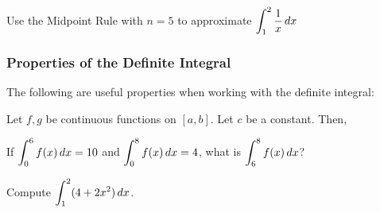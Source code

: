 \documentclass[notes]{subfiles}
\begin{document}
		\begin{ex}
			Use the Midpoint Rule with $n = 5$ to approximate $\displaystyle \int_1^2 \dfrac{1}{x}\, dx$
		\end{ex}
			\newpage
			
	\subsubsection*{Properties of the Definite Integral}	
		The following are useful properties when working with the definite integral:
			\begin{thm}
				 Let $f,g$ be continuous functions on $[a,b]$.  Let $c$ be a constant.  Then,
			\end{thm}
		
		\begin{ex}
			If $\displaystyle \int_0^6 f(x)\, dx = 10$ and $\displaystyle \int_0^8 f(x)\, dx = 4$, what is $\displaystyle\int_6^8 f(x)\, dx$?
		\end{ex}	
			\newpage
	
		\begin{ex}
			Compute $\displaystyle \int_1^2 (4+2x^2)\,dx$.
		\end{ex}
\end{document}
